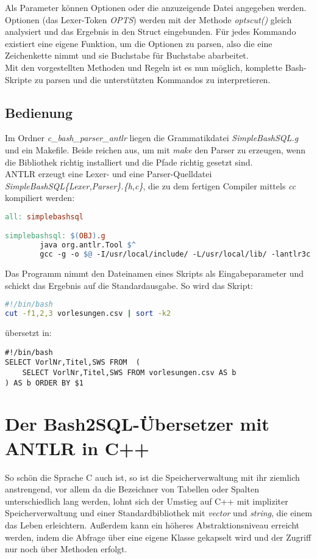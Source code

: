 Als Parameter können Optionen oder die anzuzeigende Datei angegeben werden. Optionen (das Lexer-Token \textit{OPTS}) werden mit der Methode \textit{optscut()} gleich analysiert und das Ergebnis in den Struct eingebunden. Für jedes Kommando existiert eine eigene Funktion, um die Optionen zu parsen, also die eine Zeichenkette nimmt und sie Buchstabe für Buchstabe abarbeitet.\\

Mit den vorgestellten Methoden und Regeln ist es nun möglich, komplette Bash-Skripte zu parsen und die unterstützten Kommandos zu interpretieren.

\subsection{Bedienung}
Im Ordner \textit{c\_bash\_parser\_antlr} liegen die Grammatikdatei \textit{SimpleBashSQL.g} und ein Makefile. Beide reichen aus, um mit \textit{make} den Parser zu erzeugen, wenn die Bibliothek richtig installiert und die Pfade richtig gesetzt sind.\\
ANTLR erzeugt eine Lexer- und eine Parser-Quelldatei \textit{SimpleBashSQL\{Lexer,Parser\}.\{h,c\}}, die zu dem fertigen Compiler mittels \textit{cc} kompiliert werden:

\begin{lstlisting}[language=make]
all: simplebashsql

simplebashsql: $(OBJ).g
        java org.antlr.Tool $^
        gcc -g -o $@ -I/usr/local/include/ -L/usr/local/lib/ -lantlr3c $(OBJ)Parser.c $(OBJ)Lexer.c
\end{lstlisting}

Das Programm nimmt den Dateinamen eines Skripts als Eingabeparameter und schickt das Ergebnis auf die Standardausgabe. So wird das Skript:
\begin{lstlisting}[language=Bash]
#!/bin/bash
cut -f1,2,3 vorlesungen.csv | sort -k2
\end{lstlisting}
übersetzt in:
\begin{lstlisting}
#!/bin/bash
SELECT VorlNr,Titel,SWS FROM  (
	SELECT VorlNr,Titel,SWS FROM vorlesungen.csv AS b
) AS b ORDER BY $1 
\end{lstlisting}
\newpage
\section{Der Bash2SQL-Übersetzer mit ANTLR in C++}
So schön die Sprache C auch ist, so ist die Speicherverwaltung mit ihr ziemlich anstrengend, vor allem da die Bezeichner von Tabellen oder Spalten unterschiedlich lang werden, lohnt sich der Umstieg auf C++ mit impliziter Speicherverwaltung und einer Standardbibliothek mit \textit{vector} und \textit{string}, die einem das Leben erleichtern. Außerdem kann ein höheres Abstraktionsniveau erreicht werden, indem die Abfrage über eine eigene Klasse gekapselt wird und der Zugriff nur noch über Methoden erfolgt.

